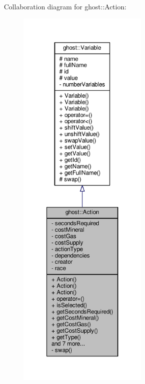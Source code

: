 Collaboration diagram for ghost\-:\-:Action\-:
\nopagebreak
\begin{figure}[H]
\begin{center}
\leavevmode
\includegraphics[height=550pt]{classghost_1_1Action__coll__graph}
\end{center}
\end{figure}
